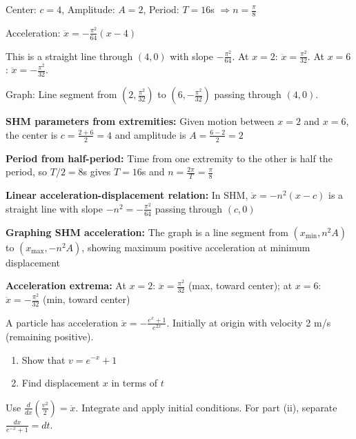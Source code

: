 \begin{solution}
Center: $c = 4$, Amplitude: $A = 2$, Period: $T = 16$s $\Rightarrow n = \frac{\pi}{8}$

Acceleration: $\ddot{x} = -\frac{\pi^2}{64}(x-4)$

This is a straight line through $(4, 0)$ with slope $-\frac{\pi^2}{64}$. At $x=2$: $\ddot{x} = \frac{\pi^2}{32}$. At $x=6$: $\ddot{x} = -\frac{\pi^2}{32}$.

Graph: Line segment from $(2, \frac{\pi^2}{32})$ to $(6, -\frac{\pi^2}{32})$ passing through $(4, 0)$.
\end{solution}

\begin{takeaways}
\item \textbf{SHM parameters from extremities:} Given motion between $x=2$ and $x=6$, the center is $c = \frac{2+6}{2} = 4$ and amplitude is $A = \frac{6-2}{2} = 2$
\item \textbf{Period from half-period:} Time from one extremity to the other is half the period, so $T/2 = 8$s gives $T = 16$s and $n = \frac{2\pi}{T} = \frac{\pi}{8}$
\item \textbf{Linear acceleration-displacement relation:} In SHM, $\ddot{x} = -n^2(x-c)$ is a straight line with slope $-n^2 = -\frac{\pi^2}{64}$ passing through $(c, 0)$
\item \textbf{Graphing SHM acceleration:} The graph is a line segment from $(x_{\text{min}}, n^2A)$ to $(x_{\text{max}}, -n^2A)$, showing maximum positive acceleration at minimum displacement
\item \textbf{Acceleration extrema:} At $x=2$: $\ddot{x} = \frac{\pi^2}{32}$ (max, toward center); at $x=6$: $\ddot{x} = -\frac{\pi^2}{32}$ (min, toward center)
\end{takeaways}

\begin{problem}
A particle has acceleration $\ddot{x} = -\frac{e^x + 1}{e^{2x}}$. Initially at origin with velocity 2 m/s (remaining positive).
\begin{enumerate}[label=\textbf{\roman*.}]
    \item Show that $v = e^{-x} + 1$
    \item Find displacement $x$ in terms of $t$
\end{enumerate}
\end{problem}

\begin{hint}
Use $\frac{d}{dx}\left(\frac{v^2}{2}\right) = \ddot{x}$. Integrate and apply initial conditions. For part (ii), separate $\frac{dx}{e^{-x}+1} = dt$.
\end{hint}

